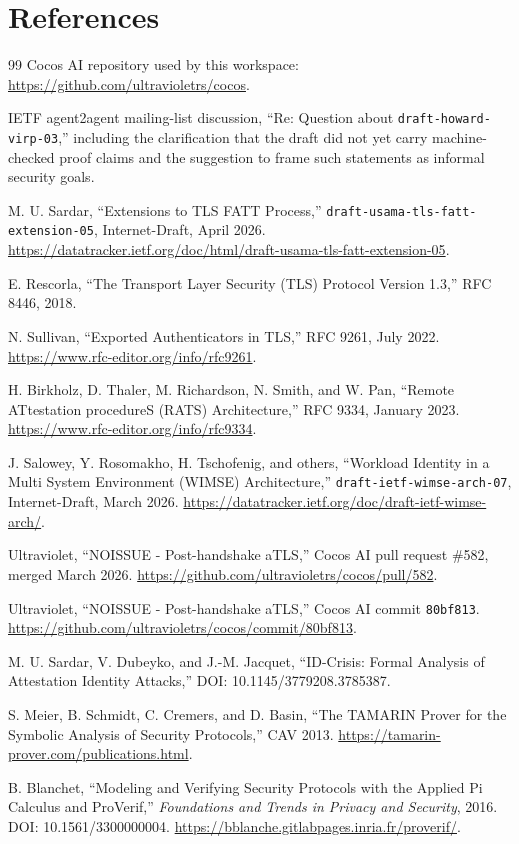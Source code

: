 \documentclass[11pt,a4paper]{article}
\begin{document}
\section*{References}

\begin{thebibliography}{99}
Cocos AI repository used by this workspace:
\url{https://github.com/ultravioletrs/cocos}.

IETF agent2agent mailing-list discussion, ``Re: Question about
\texttt{draft-howard-virp-03},'' including the clarification that the draft did
not yet carry machine-checked proof claims and the suggestion to frame such
statements as informal security goals.

M. U. Sardar, ``Extensions to TLS FATT Process,''
\texttt{draft-usama-tls-fatt-extension-05}, Internet-Draft, April 2026.
\url{https://datatracker.ietf.org/doc/html/draft-usama-tls-fatt-extension-05}.

E. Rescorla, ``The Transport Layer Security (TLS) Protocol Version 1.3,''
RFC 8446, 2018.

N. Sullivan, ``Exported Authenticators in TLS,'' RFC 9261, July 2022.
\url{https://www.rfc-editor.org/info/rfc9261}.

H. Birkholz, D. Thaler, M. Richardson, N. Smith, and W. Pan, ``Remote
ATtestation procedureS (RATS) Architecture,'' RFC 9334, January 2023.
\url{https://www.rfc-editor.org/info/rfc9334}.

J. Salowey, Y. Rosomakho, H. Tschofenig, and others, ``Workload Identity in a
Multi System Environment (WIMSE) Architecture,''
\texttt{draft-ietf-wimse-arch-07}, Internet-Draft, March 2026.
\url{https://datatracker.ietf.org/doc/draft-ietf-wimse-arch/}.

Ultraviolet, ``NOISSUE - Post-handshake aTLS,'' Cocos AI pull request \#582,
merged March 2026.
\url{https://github.com/ultravioletrs/cocos/pull/582}.

Ultraviolet, ``NOISSUE - Post-handshake aTLS,'' Cocos AI commit
\texttt{80bf813}.
\url{https://github.com/ultravioletrs/cocos/commit/80bf813}.

M. U. Sardar, V. Dubeyko, and J.-M. Jacquet, ``ID-Crisis: Formal Analysis of
Attestation Identity Attacks,'' DOI: 10.1145/3779208.3785387.

S. Meier, B. Schmidt, C. Cremers, and D. Basin, ``The TAMARIN Prover for the
Symbolic Analysis of Security Protocols,'' CAV 2013.
\url{https://tamarin-prover.com/publications.html}.

B. Blanchet, ``Modeling and Verifying Security Protocols with the Applied Pi
Calculus and ProVerif,'' \emph{Foundations and Trends in Privacy and
Security}, 2016. DOI: 10.1561/3300000004.
\url{https://bblanche.gitlabpages.inria.fr/proverif/}.
\end{thebibliography}
\end{document}
